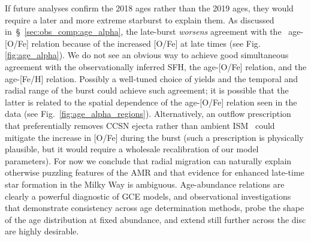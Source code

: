 \documentclass[draft2.tex]{subfiles}
\begin{document}
If future analyses confirm the 2018 ages rather than the 2019 ages, they would 
require a later and more extreme starburst to explain them. 
As discussed in~\S~\ref{sec:obs_comp:age_alpha}, the late-burst 
\textit{worsens} agreement with the~\citet{Feuillet2018, Feuillet2019} 
age-[O/Fe] relation because of the increased [O/Fe] at late times (see Fig. 
\ref{fig:age_alpha}). 
We do not see an obvious way to achieve good simultaneous agreement with the 
observationally inferred SFH, the age-[O/Fe] relation, and the age-[Fe/H] 
relation. 
Possibly a well-tuned choice of yields and the temporal and radial range of 
the burst could achieve such agreement; it is possible that the latter is 
related to the spatial dependence of the age-[O/Fe] relation seen in 
the~\citet{Feuillet2019} data (see Fig.~\ref{fig:age_alpha_regions}). 
Alternatively, an outflow prescription that preferentially removes CCSN 
ejecta rather than ambient ISM~\citep[see, e.g.,][]{Vincenzo2016, Chisholm2018, 
Christensen2018} could mitigate the increase in [O/Fe] during the burst (such a 
prescription is physically plausible, but it would require a wholesale 
recalibration of our model parameters). 
For now we conclude that radial migration can naturally explain otherwise 
puzzling features of the AMR and that evidence for enhanced late-time star 
formation in the Milky Way is ambiguous. 
Age-abundance relations are clearly a powerful diagnostic of GCE models, and 
observational investigations that demonstrate consistency across age 
determination methods, probe the shape of the age distribution at fixed 
abundance, and extend still further across the disc are highly desirable. 
\end{document}
